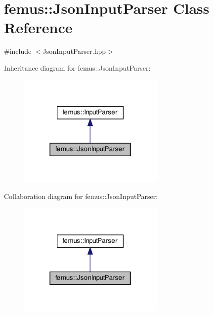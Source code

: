 \hypertarget{classfemus_1_1_json_input_parser}{}\section{femus\+:\+:Json\+Input\+Parser Class Reference}
\label{classfemus_1_1_json_input_parser}


{\ttfamily \#include $<$Json\+Input\+Parser.\+hpp$>$}



Inheritance diagram for femus\+:\+:Json\+Input\+Parser\+:
\nopagebreak
\begin{figure}[H]
\begin{center}
\leavevmode
\includegraphics[width=202pt]{classfemus_1_1_json_input_parser__inherit__graph}
\end{center}
\end{figure}


Collaboration diagram for femus\+:\+:Json\+Input\+Parser\+:
\nopagebreak
\begin{figure}[H]
\begin{center}
\leavevmode
\includegraphics[width=202pt]{classfemus_1_1_json_input_parser__coll__graph}
\end{center}
\end{figure}
